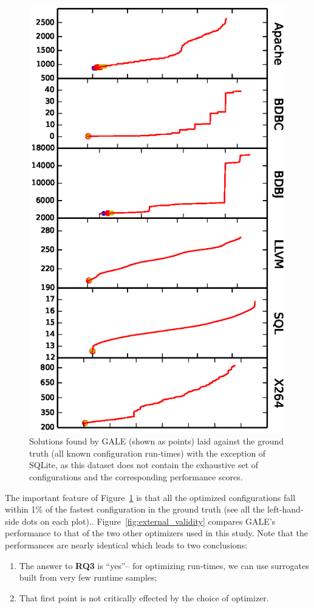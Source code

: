 \documentclass{sig-alternative}
\newcommand{\be}{\begin{enumerate}}
\newcommand{\ee}{\end{enumerate}}
\newcommand{\fig}[1]{Figure~\ref{fig:#1}}
\begin{document}
\begin{figure}[!t]
\includegraphics[width=0.9\linewidth]{Figures/optimizer_result.eps}
\caption{Solutions found by GALE (shown as points) laid against the ground truth (all known configuration run-times) with the exception of SQLite, as this dataset does not contain the exhaustive set of configurations and the corresponding performance scores.}\label{fig:performance_graph}
\end{figure}


The important feature of \fig{performance_graph} is that all the optimized configurations fall within 1\% of the fastest
configuration in the ground truth (see all the left-hand-side dots on each plot).. \fig{external_validity} compares GALE's performance to that of the two other optimizers
used in this study. Note that the performances are nearly identical which leads to two conclusions:
\be
\item The answer to {\bf RQ3} is ``yes''-- for optimizing run-times, we can use surrogates built from very few runtime samples;
\item That first point is not critically effected by the choice of optimizer.  
\ee
\end{document}

